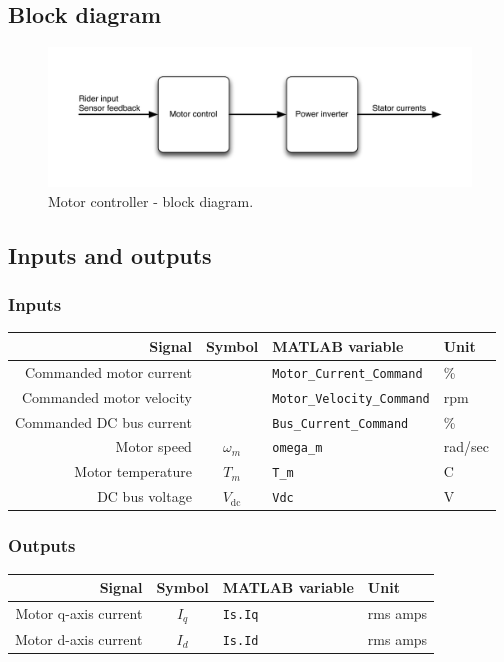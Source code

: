 \documentclass[../SimBALink.tex]{subfiles}
\begin{document}
\subsection{Block diagram}
	\begin{figure}[h]
		\centering
		\includegraphics[width=\linewidth]{motor_controller_block_diagram}
		\caption{Motor controller - block diagram.}			\label{fig:motor_controller_block_diagram}
	\end{figure}
	\FloatBarrier

\subsection{Inputs and outputs}
	\subsubsection{Inputs}
	\begin{tabular}{ r | c | l | l }
		Signal						&	Symbol				&	MATLAB variable				&	Unit						\\\hline	
		Commanded motor current		&						&	\texttt{Motor\_Current\_Command}	&	\%					\\
		Commanded motor velocity		&						&	\texttt{Motor\_Velocity\_Command}	&	rpm			\\
		Commanded DC bus current		&						&	\texttt{Bus\_Current\_Command}	&	\%			\\
		Motor speed					&	$\omega_m$			&	\texttt{omega\_m}				&	rad/sec		\\
		Motor temperature				&	$T_m$				&	\texttt{T\_m}					&	\degree C		\\
		DC bus voltage				&	$V_\text{dc}$			&	\texttt{Vdc}					&	V
	\end{tabular}
	
	\subsubsection{Outputs}
		\begin{tabular}{ r | c | l | l }
			Signal						&	Symbol				&	MATLAB variable	&	Unit						\\\hline	
			Motor q-axis current			&	$I_q$				&	\texttt{Is.Iq}		&	rms amps			\\
			Motor d-axis current			&	$I_d$				&	\texttt{Is.Id}		&	rms amps
		\end{tabular}
	
\end{document}
